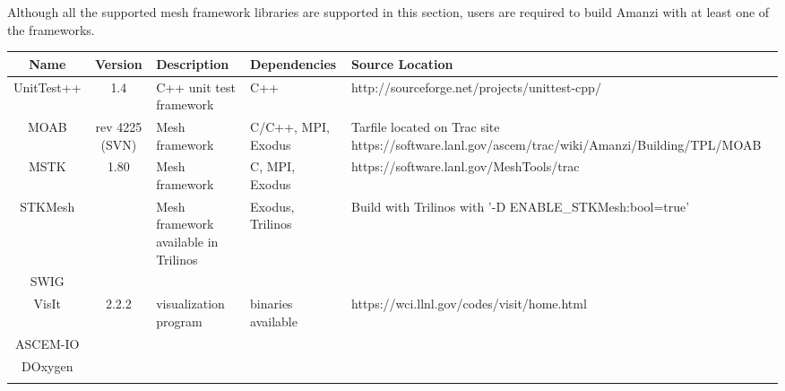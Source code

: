 \documentclass[12pt]{article}
\begin{document}
Although all the supported mesh framework libraries are supported in this section, users are required to build
Amanzi with at least one of the frameworks. 

\begin{table}[htdp]
\begin{center}
\begin{tabular}{|c|c|p{3cm}|p{3cm}|p{3cm}|}
\hline
\hline
Name & Version & Description & Dependencies & Source Location \\
\hline
UnitTest++ & 1.4 & C++ unit test framework & C++ & http://sourceforge.net/projects/unittest-cpp/ \\
\hline
MOAB & rev 4225 (SVN) & Mesh framework & C/C++, MPI, Exodus & Tarfile located on Trac site https://software.lanl.gov/ascem/trac/wiki/Amanzi/Building/TPL/MOAB  \\
\hline
MSTK & 1.80 & Mesh framework & C, MPI, Exodus & https://software.lanl.gov/MeshTools/trac\\
\hline
STKMesh & & Mesh framework available in Trilinos & Exodus, Trilinos & Build with Trilinos with '-D ENABLE\_STKMesh:bool=true'  \\
\hline
SWIG &&&& \\
\hline
VisIt & 2.2.2 & visualization program & binaries available &  https://wci.llnl.gov/codes/visit/home.html \\
\hline
ASCEM-IO &&&& \\
\hline
DOxygen &&&& \\

&&&& \\
\hline


\end{tabular}
\end{center}
\label{default}
\end{table}%
\end{document}
